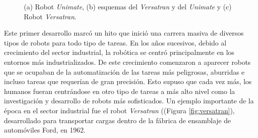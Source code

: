 \begin{figure}[htbp!]
	\begin{center}
		\hspace{0.1cm}
		\hspace{0.1cm}
	\end{center}	
	\centering
	\captionsetup{justification=centering,margin=2.5cm}
	\caption{(a) Robot \textit{Unimate}, (b) esquemas del \textit{Versatran} y del \textit{Unimate} y (c) Robot \textit{Versatran}.}
	\label{fig:robots1}
\end{figure}

Este primer desarrollo marcó un hito que inició una carrera masiva de diversos tipos de robots para todo tipo de tareas. En los años sucesivos, debido al crecimiento del sector industrial, la robótica se centró principalmente en los entornos más industrializados. De este crecimiento comenzaron a aparecer robots que se ocupaban de la automatización de las tareas más peligrosas, aburridas e incluso tareas que requerían de gran precisión. Esto supuso que cada vez más, los humanos fueran centrándose en otro tipo de tareas a más alto nivel como la investigación y desarrollo de robots más sofisticados. Un ejemplo importante de la época en el sector industrial fue el robot \textit{Versatran} ((Figura \ref{fig:versatran}), desarrollado para transportar cargas dentro de la fábrica de ensamblaje de automóviles Ford, en 1962.

